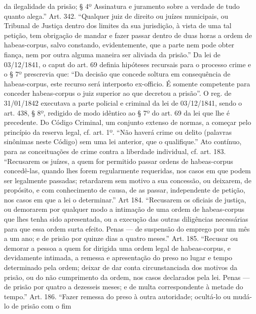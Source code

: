 {  da ilegalidade da prisão; § 4º Assinatura e juramento sobre a verdade
  de tudo quanto alega.'' Art. 342. ``Qualquer juiz de direito ou juízes
  municipais, ou Tribunal de Justiça dentro dos limites da sua
  jurisdição, à vista de uma tal petição, tem obrigação de mandar e
  fazer passar dentro de duas horas a ordem de habeas-corpus, salvo
  constando, evidentemente, que a parte nem pode obter fiança, nem por
  outra alguma maneira ser aliviada da prisão.'' Da lei de 03/12/1841, o
  caput do art. 69 definia hipóteses recursais para o processo crime e o
  § 7º prescrevia que: ``Da decisão que concede soltura em consequência
  de habeas-corpus, este recurso será interposto ex-officio. É somente
  competente para conceder habeas-corpus o juiz superior ao que decretou
  a prisão''. O reg. de 31/01/1842 executava a parte policial e criminal
  da lei de 03/12/1841, sendo o art. 438, § 8º, redigido de modo
  idêntico ao § 7º do art. 69 da lei que lhe é precedente. Do Código
  Criminal, um conjunto extenso de normas, a começar pelo princípio da
  reserva legal, cf. art. 1º. ``Não haverá crime ou delito (palavras
  sinônimas neste Código) sem uma lei anterior, que o qualifique.'' Ato
  contínuo, para as conceituações de crime contra a liberdade
  individual, cf. art. 183. ``Recusarem os juízes, a quem for permitido
  passar ordens de habeas-corpus concedê-las, quando lhes forem
  regularmente requeridas, nos casos em que podem ser legalmente
  passadas; retardarem sem motivo a sua concessão, ou deixarem, de
  propósito, e com conhecimento de causa, de as passar, independente de
  petição, nos casos em que a lei o determinar.'' Art 184. ``Recusarem
  os oficiais de justiça, ou demorarem por qualquer modo a intimação de
  uma ordem de habeas-corpus que lhes tenha sido apresentada, ou a
  execução das outras diligências necessárias para que essa ordem surta
  efeito. Penas --- de suspensão do emprego por um mês a um ano; e de
  prisão por quinze dias a quatro meses.'' Art. 185. ``Recusar ou
  demorar a pessoa a quem for dirigida uma ordem legal de habeas-corpus,
  e devidamente intimada, a remessa e apresentação do preso no lugar e
  tempo determinado pela ordem; deixar de dar conta circunstanciada dos
  motivos da prisão, ou do não cumprimento da ordem, nos casos
  declarados pela lei. Penas --- de prisão por quatro a dezesseis meses; e
  de multa correspondente à metade do tempo.'' Art. 186. ``Fazer remessa
  do preso à outra autoridade; ocultá-lo ou mudá-lo de prisão com o fim
}
